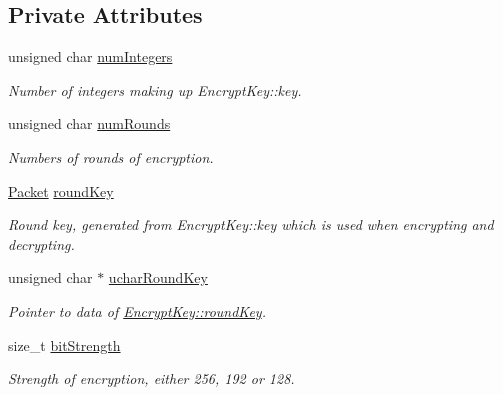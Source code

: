\subsection*{Private Attributes}
\begin{DoxyCompactItemize}
\item 
\hypertarget{class_encrypt_key_abd59d56b6d2688cb5e40fc6fee1ee47c}{
unsigned char \hyperlink{class_encrypt_key_abd59d56b6d2688cb5e40fc6fee1ee47c}{numIntegers}}
\label{class_encrypt_key_abd59d56b6d2688cb5e40fc6fee1ee47c}

\begin{DoxyCompactList}\small\item\em Number of integers making up EncryptKey::key. \item\end{DoxyCompactList}\item 
\hypertarget{class_encrypt_key_a27e4b1962229a87f912c20da73ffa892}{
unsigned char \hyperlink{class_encrypt_key_a27e4b1962229a87f912c20da73ffa892}{numRounds}}
\label{class_encrypt_key_a27e4b1962229a87f912c20da73ffa892}

\begin{DoxyCompactList}\small\item\em Numbers of rounds of encryption. \item\end{DoxyCompactList}\item 
\hypertarget{class_encrypt_key_a5ad5f44db28e7fd41897687aa8c3209b}{
\hyperlink{class_packet}{Packet} \hyperlink{class_encrypt_key_a5ad5f44db28e7fd41897687aa8c3209b}{roundKey}}
\label{class_encrypt_key_a5ad5f44db28e7fd41897687aa8c3209b}

\begin{DoxyCompactList}\small\item\em Round key, generated from EncryptKey::key which is used when encrypting and decrypting. \item\end{DoxyCompactList}\item 
\hypertarget{class_encrypt_key_a9af3de670f8f02277ee542007cc56348}{
unsigned char $\ast$ \hyperlink{class_encrypt_key_a9af3de670f8f02277ee542007cc56348}{ucharRoundKey}}
\label{class_encrypt_key_a9af3de670f8f02277ee542007cc56348}

\begin{DoxyCompactList}\small\item\em Pointer to data of \hyperlink{class_encrypt_key_a5ad5f44db28e7fd41897687aa8c3209b}{EncryptKey::roundKey}. \item\end{DoxyCompactList}\item 
\hypertarget{class_encrypt_key_af1de3e227d5a44dde9d4c4e4609ecb44}{
size\_\-t \hyperlink{class_encrypt_key_af1de3e227d5a44dde9d4c4e4609ecb44}{bitStrength}}
\label{class_encrypt_key_af1de3e227d5a44dde9d4c4e4609ecb44}

\begin{DoxyCompactList}\small\item\em Strength of encryption, either 256, 192 or 128. \item\end{DoxyCompactList}\end{DoxyCompactItemize}



